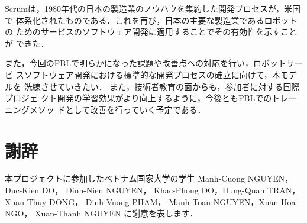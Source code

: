 \documentclass[a4j, 12Q, twocolumn, twoside]{jsarticle}
\begin{document}
Scrumは，1980年代の日本の製造業のノウハウを集約した開発プロセスが，米国で
体系化されたものである．これを再び，日本の主要な製造業であるロボットの
ためのサービスのソフトウェア開発に適用することでその有効性を示すことが
できた．

また，今回のPBLで明らかになった課題や改善点への対応を行い，ロボットサービ
スソフトウェア開発における標準的な開発プロセスの確立に向けて，本モデルを
洗練させていきたい． また，技術者教育の面からも，参加者に対する国際プロジェ
クト開発の学習効果がより向上するように，今後ともPBLでのトレーニングメソッ
ドとして改善を行っていく予定である．

\section*{謝辞}
本プロジェクトに参加したベトナム国家大学の学生
Manh-Cuong NGUYEN， Duc-Kien DO， Dinh-Nien NGUYEN，
Khac-Phong DO，Hung-Quan TRAN， Xuan-Thuy DONG，
Dinh-Vuong PHAM， Manh-Toan NGUYEN，Xuan-Hoa NGO， Xuan-Thanh NGUYEN
に謝意を表します．



\end{document}
